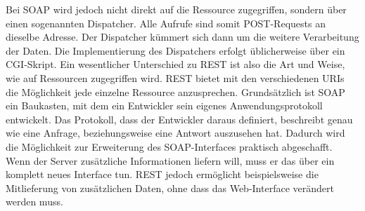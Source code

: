 Bei SOAP wird jedoch nicht direkt auf die Ressource zugegriffen, sondern über einen sogenannten Dispatcher. Alle Aufrufe sind somit POST-Requests an dieselbe Adresse. Der Dispatcher kümmert sich dann um die weitere Verarbeitung der Daten. Die Implementierung des Dispatchers erfolgt üblicherweise über ein CGI-Skript. Ein wesentlicher Unterschied zu REST ist also die Art und Weise, wie auf Ressourcen zugegriffen wird. REST bietet mit den verschiedenen URIs die Möglichkeit jede einzelne Ressource anzusprechen. Grundsätzlich ist SOAP ein Baukasten, mit dem ein Entwickler sein eigenes Anwendungsprotokoll entwickelt. Das Protokoll, dass der Entwickler daraus definiert, beschreibt genau wie eine Anfrage, beziehungsweise eine Antwort auszusehen hat. Dadurch wird die Möglichkeit zur Erweiterung des SOAP-Interfaces praktisch abgeschafft. Wenn der Server zusätzliche Informationen liefern will, muss er das über ein komplett neues Interface tun. REST jedoch ermöglicht beispielsweise die Mitlieferung von zusätzlichen Daten, ohne dass das Web-Interface verändert werden muss. \cite{RestSoap}
